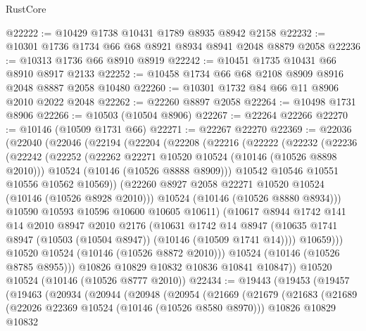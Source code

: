 \begin{lexlean}{RustCore}
\begin{coremodule}
@22222 := @10429 @1738 @10431 @1789 @8935 @8942 @2158
@22232 := @10301 @1736 @1734 @66 @68 @8921 @8934 @8941 @2048 @8879 @2058
@22236 := @10313 @1736 @66 @8910 @8919
@22242 := @10451 @1735 @10431 @66 @8910 @8917 @2133
@22252 := @10458 @1734 @66 @68 @2108 @8909 @8916 @2048 @8887 @2058 @10480
@22260 := @10301 @1732 @84 @66 @11 @8906 @2010 @2022 @2048
@22262 := @22260 @8897 @2058
@22264 := @10498 @1731 @8906
@22266 := @10503 (@10504 @8906)
@22267 := @22264 @22266
@22270 := @10146 (@10509 @1731 @66)
@22271 := @22267 @22270
@22369 := @22036
    (@22040
      (@22046
        (@22194
          (@22204
            (@22208
              (@22216
                (@22222
                  (@22232
                    (@22236
                      (@22242
                        (@22252
                          (@22262 @22271 @10520 @10524 (@10146 (@10526 @8898 @2010)))
                          @10524
                          (@10146 (@10526 @8888 @8909)))
                        @10542
                        @10546
                        @10551
                        @10556
                        @10562
                        @10569))
                    (@22260 @8927 @2058 @22271 @10520 @10524 (@10146 (@10526 @8928 @2010)))
                    @10524
                    (@10146 (@10526 @8880 @8934)))
                  @10590
                  @10593
                  @10596
                  @10600
                  @10605
                  @10611)
                (@10617
                  @8944
                  @1742
                  @141
                  @14
                  @2010
                  @8947
                  @2010
                  @2176
                  (@10631
                    @1742
                    @14
                    @8947
                    (@10635 @1741 @8947 (@10503 (@10504 @8947)) (@10146 (@10509 @1741 @14))))
                  @10659)))
            @10520
            @10524
            (@10146 (@10526 @8872 @2010)))
          @10524
          (@10146 (@10526 @8785 @8955)))
        @10826
        @10829
        @10832
        @10836
        @10841
        @10847))
    @10520
    @10524
    (@10146 (@10526 @8777 @2010))
@22434 := @19443
    (@19453
      (@19457
        (@19463
          (@20934
            (@20944
              (@20948
                (@20954
                  (@21669
                    (@21679
                      (@21683
                        (@21689
                          (@22026 @22369 @10524 (@10146 (@10526 @8580 @8970)))
                          @10826
                          @10829
                          @10832

\end{coremodule}
\end{lexlean}
